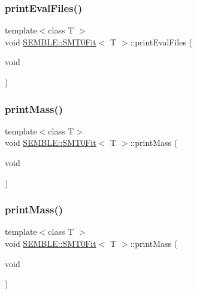 \mbox{\label{structSEMBLE_1_1SMT0Fit_a8d1f484b9943116a221db5955d27bb30}} 
\subsubsection{\texorpdfstring{printEvalFiles()}{printEvalFiles()}\hspace{0.1cm}{\footnotesize\ttfamily [2/2]}}
{\footnotesize\ttfamily template$<$class T $>$ \\
void \mbox{\hyperlink{structSEMBLE_1_1SMT0Fit}{S\+E\+M\+B\+L\+E\+::\+S\+M\+T0\+Fit}}$<$ T $>$\+::print\+Eval\+Files (\begin{DoxyParamCaption}\item[{void}]{ }\end{DoxyParamCaption})}

\mbox{\label{structSEMBLE_1_1SMT0Fit_af74d4bc3a5a2da2fa8cd263558acf71a}} 
\subsubsection{\texorpdfstring{printMass()}{printMass()}\hspace{0.1cm}{\footnotesize\ttfamily [1/2]}}
{\footnotesize\ttfamily template$<$class T$>$ \\
void \mbox{\hyperlink{structSEMBLE_1_1SMT0Fit}{S\+E\+M\+B\+L\+E\+::\+S\+M\+T0\+Fit}}$<$ T $>$\+::print\+Mass (\begin{DoxyParamCaption}\item[{void}]{ }\end{DoxyParamCaption})}

\mbox{\label{structSEMBLE_1_1SMT0Fit_af74d4bc3a5a2da2fa8cd263558acf71a}} 
\subsubsection{\texorpdfstring{printMass()}{printMass()}\hspace{0.1cm}{\footnotesize\ttfamily [2/2]}}
{\footnotesize\ttfamily template$<$class T $>$ \\
void \mbox{\hyperlink{structSEMBLE_1_1SMT0Fit}{S\+E\+M\+B\+L\+E\+::\+S\+M\+T0\+Fit}}$<$ T $>$\+::print\+Mass (\begin{DoxyParamCaption}\item[{void}]{ }\end{DoxyParamCaption})}

